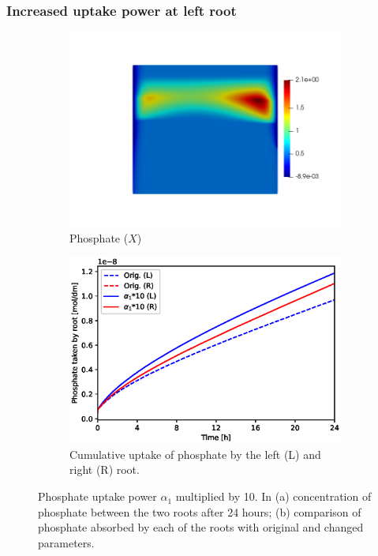 \documentclass[11pt]{article}
\numberwithin{equation}{section}
\begin{document}
\FloatBarrier
\subsubsection{Increased uptake power at left root}
\begin{figure}[!htb]
\centering
\begin{subfigure}[t]{0.45\textwidth}
    \includegraphics[trim= 100 100 60 100,width=\textwidth]{Figures/X_alpha1times10.png}
    \caption{Phosphate ($X$)}
\end{subfigure}
\qquad
\begin{subfigure}[t]{0.45\textwidth}
    \includegraphics[width=\textwidth]{Figures/alpha1times10.eps}
    \caption{Cumulative uptake of phosphate by the left (L) and right (R) root.}
\end{subfigure}

\caption{Phosphate uptake power $\alpha_1$ multiplied by 10. In (a) concentration of phosphate between the two roots after 24 hours; (b) comparison of phosphate absorbed by each of the roots with original and changed parameters.}
\end{figure}
\end{document}
